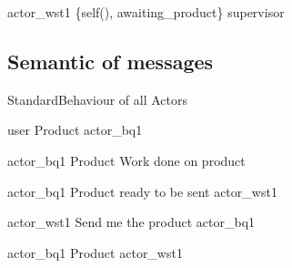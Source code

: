 \documentclass{article}
\begin{document}
\begin{landscape}
\begin{center}
\begin{sequencediagram}
\begin{messcall}
			\postlevel
			\postlevel
			\begin{messcall}
			{actor_wst1}
			{\{self(), awaiting\_product\}}
			{supervisor}

			\end{messcall}
		\end{messcall}

	\end{sequencediagram}
\end{center}
\end{landscape}

\begin{landscape}
\section*{Semantic of messages}

\thispagestyle{empty}
\begin{center}
	\begin{sequencediagram}
		 
		\begin{sdblock}{Standard}{Behaviour of all Actors}
			\begin{messcall}
				{user}
				{Product}
				{actor_bq1}

				\begin{callself}
					{actor_bq1}
					{
						Product
					}
					{
						Work done on product
					}
				\end{callself}
				\postlevel
				\postlevel
				\begin{messcall}
					{actor_bq1}
					{Product ready to be sent}
					{actor_wst1}

				\end{messcall}
			\end{messcall}
		\end{sdblock}

		\begin{messcall}
		{actor_wst1}
		{Send me the product}
		{actor_bq1}

		\end{messcall}

		\begin{messcall}
			{actor_bq1}
			{Product}
			{actor_wst1}


\end{messcall}
\end{sequencediagram}
\end{center}
\end{landscape}
\end{document}
